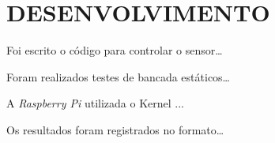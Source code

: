 \chapter{DESENVOLVIMENTO}

Foi escrito o código para controlar o sensor\ldots

Foram realizados testes de bancada estáticos\ldots

A \emph{Raspberry Pi} utilizada o Kernel ...

Os resultados foram registrados no formato\ldots
